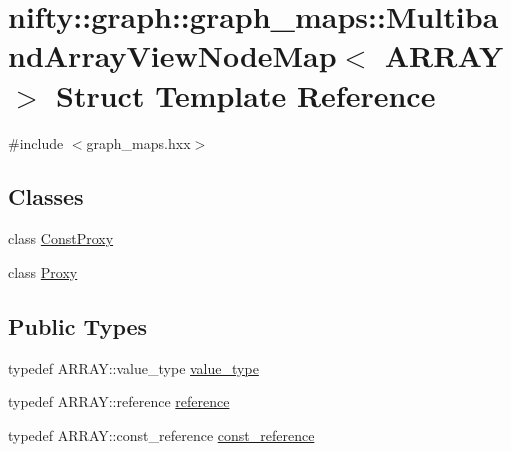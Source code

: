 \hypertarget{structnifty_1_1graph_1_1graph__maps_1_1MultibandArrayViewNodeMap}{}\section{nifty\+:\+:graph\+:\+:graph\+\_\+maps\+:\+:Multiband\+Array\+View\+Node\+Map$<$ A\+R\+R\+AY $>$ Struct Template Reference}
\label{structnifty_1_1graph_1_1graph__maps_1_1MultibandArrayViewNodeMap}


{\ttfamily \#include $<$graph\+\_\+maps.\+hxx$>$}

\subsection*{Classes}
\begin{DoxyCompactItemize}
\item 
class \hyperlink{classnifty_1_1graph_1_1graph__maps_1_1MultibandArrayViewNodeMap_1_1ConstProxy}{Const\+Proxy}
\item 
class \hyperlink{classnifty_1_1graph_1_1graph__maps_1_1MultibandArrayViewNodeMap_1_1Proxy}{Proxy}
\end{DoxyCompactItemize}
\subsection*{Public Types}
\begin{DoxyCompactItemize}
\item 
typedef A\+R\+R\+A\+Y\+::value\+\_\+type \hyperlink{structnifty_1_1graph_1_1graph__maps_1_1MultibandArrayViewNodeMap_a1abb884732263c022895486ce3adf8c1}{value\+\_\+type}
\item 
typedef A\+R\+R\+A\+Y\+::reference \hyperlink{structnifty_1_1graph_1_1graph__maps_1_1MultibandArrayViewNodeMap_ae8a745152ddc0f45748a17dc130403f6}{reference}
\item 
typedef A\+R\+R\+A\+Y\+::const\+\_\+reference \hyperlink{structnifty_1_1graph_1_1graph__maps_1_1MultibandArrayViewNodeMap_a9a4da5d4bb0e9439af359184b91bc65b}{const\+\_\+reference}
\end{DoxyCompactItemize}
